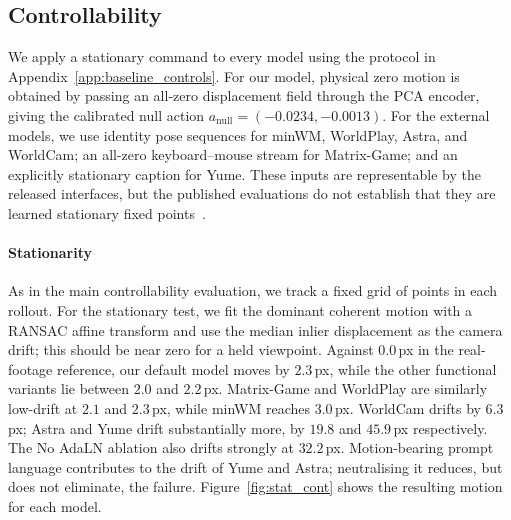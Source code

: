 \subsection{Controllability}
\label{app:stationary_controllability}

We apply a stationary command to every model using the protocol in
Appendix~\ref{app:baseline_controls}. For our model, physical zero motion is
obtained by passing an all-zero displacement field through the PCA encoder,
giving the calibrated null action
$a_{\mathrm{null}}=(-0.0234,-0.0013)$. For the external models, we use identity
pose sequences for minWM, WorldPlay, Astra, and WorldCam; an all-zero
keyboard--mouse stream for Matrix-Game; and an explicitly stationary caption
for Yume. These inputs are representable by the released interfaces, but the
published evaluations do not establish that they are learned stationary fixed
points~\cite{minwm,worldcam,astra,matrixgame2,hyworldplay,yume}.

\paragraph{Stationarity}
As in the main controllability evaluation, we track a fixed grid of points in
each rollout. For the stationary test, we fit the dominant coherent motion with
a RANSAC affine transform and use the median inlier displacement as the camera
drift; this should be near zero for a held viewpoint. Against $0.0$\,px in the
real-footage reference, our default model moves by $2.3$\,px, while the other
functional variants lie between $2.0$ and $2.2$\,px. Matrix-Game and WorldPlay
are similarly low-drift at $2.1$ and $2.3$\,px, while minWM reaches $3.0$\,px.
WorldCam drifts by $6.3$\,px; Astra and Yume drift substantially more, by
$19.8$ and $45.9$\,px respectively. The No AdaLN ablation also drifts strongly
at $32.2$\,px. Motion-bearing prompt language contributes to the drift of Yume
and Astra; neutralising it reduces, but does not eliminate, the failure.
Figure~\ref{fig:stat_cont} shows the resulting motion for each model.

